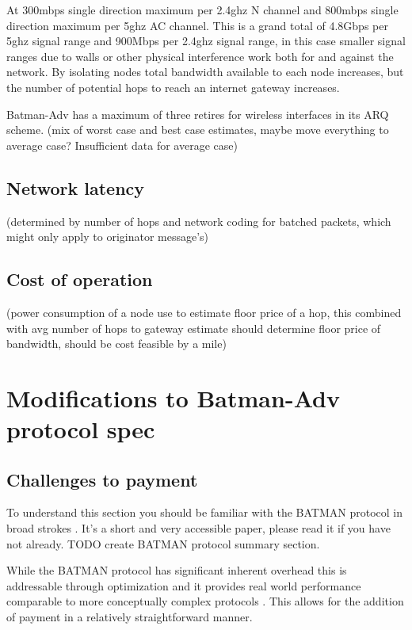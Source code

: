 \documentclass[11pt]{article}
\begin{document}
    At 300mbps single direction maximum per 2.4ghz N channel and 800mbps single direction maximum per 5ghz AC channel. This is a grand total of 4.8Gbps per 5ghz signal range and 900Mbps per 2.4ghz signal range, in this case smaller signal ranges due to walls or other physical interference work both for and against the network. By isolating nodes total bandwidth available to each node increases, but the number of potential hops to reach an internet gateway increases. 
    
    Batman-Adv has a maximum of three retires for wireless interfaces in its ARQ scheme. (mix of worst case and best case estimates, maybe move everything to average case? Insufficient data for average case) 
    
    \subsection{Network latency}
    
    (determined by number of hops and network coding for batched packets, which might only apply to originator message's)

    \subsection{Cost of operation}

    (power consumption of a node use to estimate floor price of a hop, this combined with avg number of hops to gateway estimate should determine floor price of bandwidth, should be cost feasible by a mile)

\section{Modifications to Batman-Adv protocol spec}

	\subsection{Challenges to payment}

	To understand this section you should be familiar with the BATMAN protocol in broad strokes \cite{batman}. It's a short and very accessible paper, please read it if you have not already. TODO create BATMAN protocol summary section.

	While the BATMAN protocol has significant inherent overhead this is addressable through optimization \cite{catwoman, batroam} and it provides real world performance comparable to more conceptually complex protocols \cite{meshperf}. This allows for the addition of payment in a relatively straightforward manner.
\end{document}
